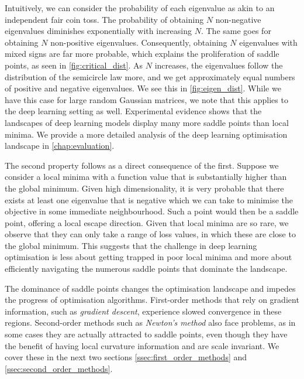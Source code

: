 Intuitively, we can consider the probability of each eigenvalue as akin to an independent fair coin toss. The probability of obtaining $N$ non-negative eigenvalues diminishes exponentially with increasing $N$. The same goes for obtaining $N$ non-positive eigenvalues. Consequently, obtaining $N$ eigenvalues with mixed signs are far more probable, which explains the proliferation of saddle points, as seen in \cref{fig:critical_dist}. As $N$ increases, the eigenvalues follow the distribution of the semicircle law more, and we get approximately equal numbers of positive and negative eigenvalues. We see this in \cref{fig:eigen_dist}. While we have this case for large random Gaussian matrices, we note that this applies to the deep learning setting as well. Experimental evidence shows that the landscapes of deep learning models display many more saddle points than local minima. We provide a more detailed analysis of the deep learning optimisation landscape in \cref{chap:evaluation}.

The second property follows as a direct consequence of the first. Suppose we consider a local minima with a function value that is substantially higher than the global minimum. Given high dimensionality, it is very probable that there exists at least one eigenvalue that is negative which we can take to minimise the objective in some immediate neighbourhood. Such a point would then be a saddle point, offering a local escape direction. Given that local minima are so rare, we observe that they can only take a range of loss values, in which these are close to the global minimum. This suggests that the challenge in deep learning optimisation is less about getting trapped in poor local minima and more about efficiently navigating the numerous saddle points that dominate the landscape. 

The dominance of saddle points changes the optimisation landscape and impedes the progress of optimisation algorithms. First-order methods that rely on gradient information, such as \textit{gradient descent}, experience slowed convergence in these regions. Second-order methods such as \textit{Newton's method} also face problems, as in some cases they are actually attracted to saddle points, even though they have the benefit of having local curvature information and are scale invariant. We cover these in the next two sections \cref{ssec:first_order_methods} and \cref{ssec:second_order_methods}.


